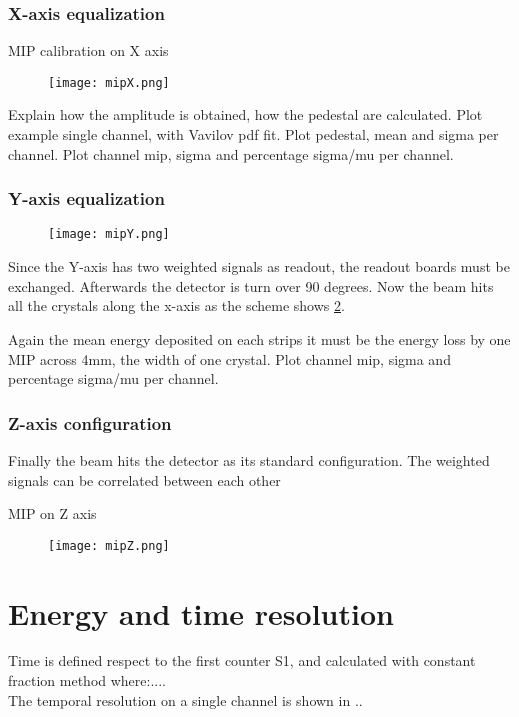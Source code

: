 \subsubsection{X-axis equalization}
MIP calibration on X axis\\
\begin{figure}[ht]
	\hspace*{\fill}
	\centering
	\texttt{[image: mipX.png]}
	\hspace*{\fill}
	\caption{}\label{mipx}
\end{figure}
Explain how the amplitude is obtained, how the pedestal are calculated.
Plot example single channel, with Vavilov pdf fit.
Plot pedestal, mean and sigma per channel.
Plot channel mip, sigma and percentage sigma/mu per channel.

\subsubsection{Y-axis equalization}
\begin{figure}[ht]
	\hspace*{\fill}
	\centering
	\texttt{[image: mipY.png]}
	\hspace*{\fill}
	\caption{}\label{mipy}
\end{figure}
Since the Y-axis has two weighted signals as readout, the readout boards must be exchanged. 
Afterwards the detector is turn over 90 degrees. Now the beam hits all the crystals along the x-axis as the scheme shows
\ref{mipy}. \par
Again the mean energy deposited on each strips it must be the energy loss by one MIP across 4mm, the width of one
crystal. 
Plot channel mip, sigma and percentage sigma/mu per channel.
\subsubsection{Z-axis configuration}
Finally the beam hits the detector as its standard configuration. The weighted signals can be correlated between each
other

MIP on Z axis\\
\begin{figure}[ht]
	\hspace*{\fill}
	\centering
	\texttt{[image: mipZ.png]}
	\hspace*{\fill}
	\caption{}\label{mipz}
\end{figure}


\section{Energy and time resolution}
Time is defined respect to the first counter S1, and calculated with constant fraction method where:....\\
The temporal resolution on a single channel is shown in ..\\


